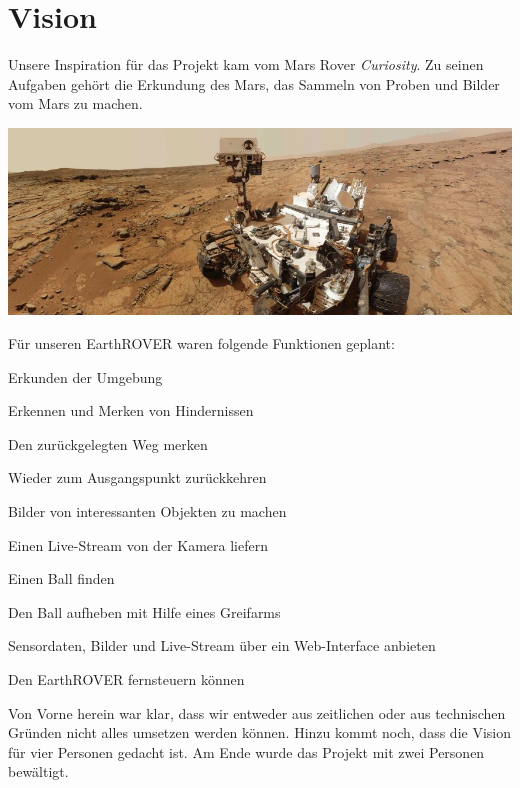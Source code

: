 \chapter{Vision}
Unsere Inspiration für das Projekt kam vom Mars Rover \textit{Curiosity}. Zu seinen Aufgaben gehört die Erkundung des Mars, das Sammeln von Proben und Bilder vom Mars zu machen. 

\begin{capfigure}[Curiosity]
	\includegraphics[width=\textwidth]{images/curiosity/curiosity}
\end{capfigure}

Für unseren EarthROVER waren folgende Funktionen geplant:
\begin{capitemize}
	\item Erkunden der Umgebung
	\item Erkennen und Merken von Hindernissen
	\item Den zurückgelegten Weg merken
	\item Wieder zum Ausgangspunkt zurückkehren
	\item Bilder von interessanten Objekten zu machen
	\item Einen Live-Stream von der Kamera liefern
	\item Einen Ball finden
	\item Den Ball aufheben mit Hilfe eines Greifarms
	\item Sensordaten, Bilder und Live-Stream über ein Web-Interface anbieten
	\item Den EarthROVER fernsteuern können
\end{capitemize}


Von Vorne herein war klar, dass wir entweder aus zeitlichen oder aus technischen Gründen nicht alles umsetzen werden können. Hinzu kommt noch, dass die Vision für vier Personen gedacht ist. Am Ende wurde das Projekt mit zwei Personen bewältigt.